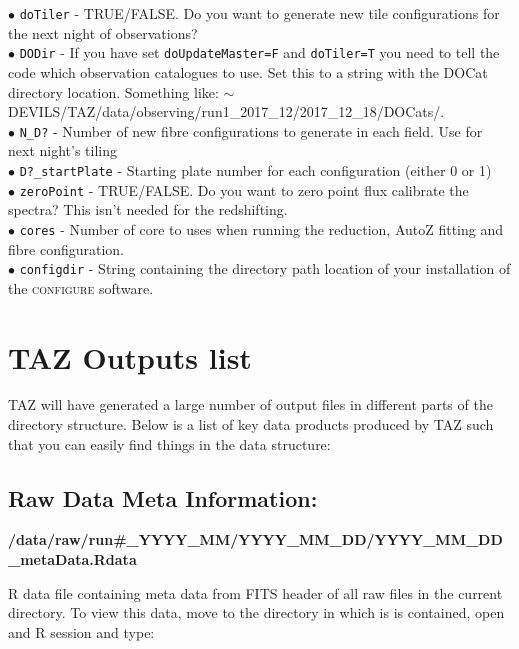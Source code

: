 \documentclass[12pt]{article}
\begin{document}
$\bullet$ \texttt{doTiler} -  TRUE/FALSE. Do you want to generate new tile configurations for the next night of observations? \\

$\bullet$ \texttt{DODir} - If you have set \texttt{doUpdateMaster=F} and \texttt{doTiler=T} you need to tell the code which observation catalogues to use. Set this to a string with the DOCat directory location. Something like: $\sim$DEVILS/TAZ/data/observing/run1\_2017\_12/2017\_12\_18/DOCats/.\\

$\bullet$ \texttt{N\_D?} - Number of new fibre configurations to generate in each field. Use for next night's tiling\\

$\bullet$ \texttt{D?\_startPlate} - Starting plate number for each configuration (either 0 or 1)\\

$\bullet$ \texttt{zeroPoint} -  TRUE/FALSE. Do you want to zero point flux calibrate the spectra? This isn't needed for the redshifting. \\

$\bullet$ \texttt{cores} - Number of core to uses when running the reduction, AutoZ fitting and fibre configuration. \\

$\bullet$ \texttt{configdir} - String containing the directory path location of your installation of the \textsc{configure} software. 



\section{TAZ Outputs list}

TAZ will have generated a large number of output files in different parts of the directory structure. Below is a list of key data products produced by TAZ such that you can easily find things in the data structure: 

\subsection{Raw Data Meta Information:}

\textbf{/data/raw/run\#\_YYYY\_MM/YYYY\_MM\_DD/YYYY\_MM\_DD\_metaData.Rdata} 

R data file containing meta data from FITS header of all raw files in the current directory. To view this data, move to the directory in which is is contained, open and R session and type: \\
\end{document}
